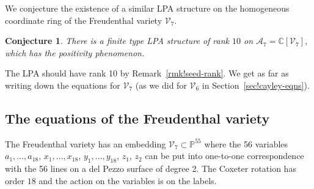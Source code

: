 \documentclass[10pt,a4paper]{amsart}
\numberwithin{equation}{section}
\newtheorem{conj}[thm]{Conjecture}
\theoremstyle{definition}
\newcommand{\CC}{\mathbb{C}}
\newcommand{\PP}{\mathbb{P}}
\begin{document}
We conjecture the existence of a similar LPA structure on the homogeneous coordinate ring of the Freudenthal variety $\mathcal V_7$.

\begin{conj}
There is a finite type LPA structure of rank $10$ on $\mathcal A_7=\CC[\mathcal V_7]$, which has the positivity phenomenon.
\end{conj}

The LPA should have rank 10 by Remark~\ref{rmk!seed-rank}. We get as far as writing down the equations for $\mathcal V_7$ (as we did for $\mathcal V_6$ in Section~\ref{sec!cayley-eqns}). %

\subsection{The equations of the Freudenthal variety}
The Freudenthal variety has an embedding $\mathcal V_7\!\!\subset\!\! \PP^{55}$ where the 56 variables $a_1,\ldots,a_{18}$, $x_1,\ldots,x_{18}$, $y_1,\ldots,y_{18}$, $z_1$, $z_2$ can be put into one-to-one correspondence with the 56 lines on a del Pezzo surface of degree 2. The Coxeter rotation has order $18$ and the action on the variables is on the labels.
\end{document}
